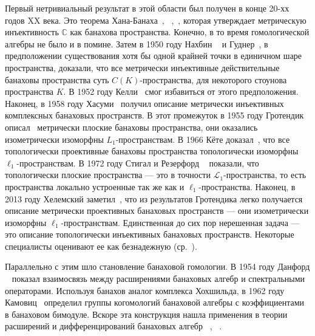 Первый нетривиальный результат в этой области был получен в конце 20-хх годов XX
века. Это теорема Хана-Банаха~\cite{HahnLinSystInLinSp},
~\cite{BanachOnLinFuncI},~\cite{BanachOnLinFuncII}, которая утверждает
метрическую инъективность $\mathbb{C}$ как банахова пространства. Конечно, в то
время гомологической алгебры не было и в помине. Затем в 1950 году Нахбин
~\cite{NachThOfHahnBanachType} и Гуднер~\cite{GooProjInNorLinSp}, в
предположении существования хотя бы одной крайней точки в единичном шаре
пространства, доказали, что все метрически инъективные действительные банаховы
пространства суть $C(K)$-пространства, для некоторого стоунова пространства $K$.
В 1952 году Келли~\cite{KellBanSpWithExtProp} смог избавиться от этого
предположения. Наконец, в 1958 году Хасуми~\cite{HasumiExtPropComplBanSp}
получил описание метрически инъективных комплексных банаховых пространств. В
этот промежуток в 1955 году Гротендик описал~\cite{GrothMetrProjFlatBanSp}
метрически плоские банаховы пространства, они оказались изометрически изоморфны
$L_1$-пространствам. В 1966 Кёте доказал~\cite{KotheTopProjBanSp}, что все
топологически проективные банаховы пространства топологически изоморфны
$\ell_1$-пространствам. В 1972 году Стигал и Резерфорд
~\cite{StegRethNucOpL1LInfSp} показали, что топологически плоские пространства
--- это в точности $\mathscr{L}_1$-пространства, то есть пространства локально
устроенные так же как и $\ell_1$-пространства. Наконец, в 2013 году Хелемский
заметил~\cite{HelMetrFrQMod}, что из результатов Гротендика легко получается
описание метрически проективных банаховых пространств --- они изометрически
изоморфны $\ell_1$-пространствам. Единственная до сих пор нерешенная задача ---
это описание топологически инъективных банаховых пространств. Некоторые
специалисты оценивают ее как безнадежную (ср.~\cite{OnSepInjBanSp}).

Параллельно с этим шло становление банаховой гомологии. В 1954 году Данфорд
~\cite{DunfSpecOp} показал взаимосвязь между расширениями банаховых алгебр и
спектральными операторами. Используя банахов аналог комплекса Хохшильда, в 1962
году Камовиц~\cite{KamohomGrComBanAlg} определил группы когомологий банаховой
алгебры с коэффициентами в банаховом бимодуле. Вскоре эта конструкция нашла
применения в теории расширений и дифференцирований банаховых алгебр
~\cite{GuichardetHomolCohomolBanAlg},
~\cite{JohnsonWeddebDecompBanAlgWithFinDimRad}. 

